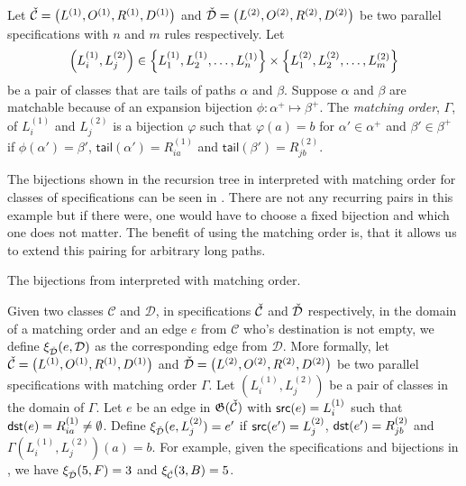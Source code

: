 \begin{definition}
Let $\check{\mathcal{C}} = \left(L^{(1)}, O^{(1)}, R^{(1)}, D^{(1)}\right)$ and $\check{\mathcal{D}} = \left(L^{(2)}, O^{(2)}, R^{(2)}, D^{(2)}\right)$ be two parallel specifications with $n$ and $m$ rules respectively. Let
\[
    \left(L^{(1)}_i,L^{(2)}_j\right) \in \left\{L^{(1)}_1,L^{(1)}_2,\dotsc,L^{(1)}_n\right\} \times \left\{L^{(2)}_1, L^{(2)}_2, \dotsc, L^{(2)}_m\right\}
\]
be a pair of classes that are tails of paths $\alpha$ and $\beta$. Suppose $\alpha$ and $\beta$ are matchable because of an expansion bijection $\phi: \alpha^+ \mapsto \beta^+$. The \emph{matching order}, $\Gamma$, of $L^{(1)}_i$ and $L^{(2)}_j$ is a bijection $\varphi$ such that $\varphi(a) = b$ for $\alpha'\in \alpha^+$ and $\beta'\in \beta^+$ if $\phi(\alpha') = \beta'$, $\textsf{tail}(\alpha') = R^{(1)}_{ia}$ and $\textsf{tail}(\beta')=R^{(2)}_{jb}$.
\end{definition}

The bijections shown in the recursion tree in  interpreted with matching order for classes of specifications can be seen in . There are not any recurring pairs in this example but if there were, one would have to choose a fixed bijection and which one does not matter. The benefit of using the matching order is, that it allows us to extend this pairing for arbitrary long paths.

\begin{table}[ht!]
    \centering
    
    \caption{The bijections from  interpreted with matching order.}
    \label{tab:corrmatch}
\end{table}

Given two classes $\mathcal{C}$ and $\mathcal{D}$, in specifications $\check{\mathcal{C}}$ and $\check{\mathcal{D}}$ respectively, in the domain of a matching order and an edge $e$ from $\mathcal{C}$ who's destination is not empty, we define $\xi_{\check{\mathcal{D}}}(e,\mathcal{D})$ as the corresponding edge from $\mathcal{D}$. More formally, let $\check{\mathcal{C}} = \left(L^{(1)}, O^{(1)}, R^{(1)}, D^{(1)}\right)$ and $\check{\mathcal{D}} = \left(L^{(2)}, O^{(2)}, R^{(2)}, D^{(2)}\right)$ be two parallel specifications with matching order $\Gamma$. Let $(L_i^{(1)}, L_j^{(2)})$ be a pair of classes in the domain of $\Gamma$. Let $e$ be an edge in $\mathfrak{G}(\check{\mathcal{C}})$ with $\textsf{src}(e) = L_i^{(1)}$ such that $\textsf{dst}(e) = R^{(1)}_{ia}\neq\emptyset$. Define $\xi_{\check{\mathcal{D}}}(e,L_j^{(2)}) = e'$ if $\textsf{src}(e') = L_j^{(2)}$, $\textsf{dst}(e') = R^{(2)}_{jb}$ and $\Gamma(L_i^{(1)}, L_j^{(2)})(a) = b$. For example, given the specifications and bijections in , we have $\xi_{\check{\mathcal{D}}}(5,F) = 3$ and $\xi_{\check{\mathcal{C}}}(3,B) = 5$.


